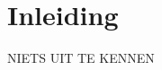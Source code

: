 \documentclass[samenvatting.tex]{subfiles}
\begin{document}
\chapter{Inleiding}
NIETS UIT TE KENNEN
\end{document}
